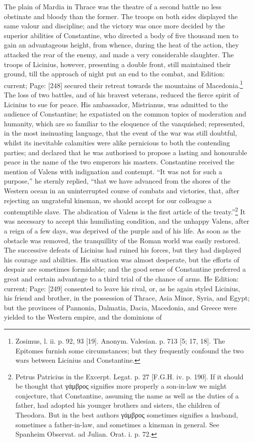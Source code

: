 The plain of Mardia in Thrace was the theatre of a second battle no less obstinate and bloody than the former. The troops on both sides displayed the same valour and discipline; and the victory was once more decided by the superior abilities of Constantine, who directed a body of five thousand men to gain an advantageous height, from whence, during the heat of the action, they attacked the rear of the enemy, and made a very considerable slaughter. The troops of Licinius, however, presenting a double front, still maintained their ground, till the approach of night put an end to the combat, and Edition: current; Page: [248] secured their retreat towards the mountains of Macedonia.\footnote{Zosimus, l. ii. p. 92, 93 [19]. Anonym. Valesian. p. 713 [5; 17, 18]. The Epitomes furnish some circumstances; but they frequently confound the two wars between Licinius and Constantine.} The loss of two battles, and of his bravest veterans, reduced the fierce spirit of Licinius to sue for peace. His ambassador, Mistrianus, was admitted to the audience of Constantine; he expatiated on the common topics of moderation and humanity, which are so familiar to the eloquence of the vanquished; represented, in the most insinuating language, that the event of the war was still doubtful, whilst its inevitable calamities were alike pernicious to both the contending parties; and declared that he was authorised to propose a lasting and honourable peace in the name of the two emperors his masters. Constantine received the mention of Valens with indignation and contempt. \texthebrew{“}It was not for such a purpose,\texthebrew{}” he sternly replied, \texthebrew{“}that we have advanced from the shores of the Western ocean in an uninterrupted course of combats and victories, that, after rejecting an ungrateful kinsman, we should accept for our colleague a contemptible slave. The abdication of Valens is the first article of the treaty.\texthebrew{}”\footnote{Petrus Patricius in the Excerpt. Legat. p. 27 [F.G.H. iv. p. 190]. If it should be thought that \textgreek{γάμβρος} signifies more properly a son-in-law we might conjecture, that Constantine, assuming the name as well as the duties of a father, had adopted his younger brothers and sisters, the children of Theodora. But in the best authors \textgreek{γάμβρος} sometimes signifies a husband, sometimes a father-in-law, and sometimes a kinsman in general. See Spanheim Observat. ad Julian. Orat. i. p. 72.} It was necessary to accept this humiliating condition, and the unhappy Valens, after a reign of a few days, was deprived of the purple and of his life. As soon as the obstacle was removed, the tranquillity of the Roman world was easily restored. The successive defeats of Licinius had ruined his forces, but they had displayed his courage and abilities. His situation was almost desperate, but the efforts of despair are sometimes formidable; and the good sense of Constantine preferred a great and certain advantage to a third trial of the chance of arms. He Edition: current; Page: [249] consented to leave his rival, or, as he again styled Licinius, his friend and brother, in the possession of Thrace, Asia Minor, Syria, and Egypt; but the provinces of Pannonia, Dalmatia, Dacia, Macedonia, and Greece were yielded to the Western empire, and the dominions of 